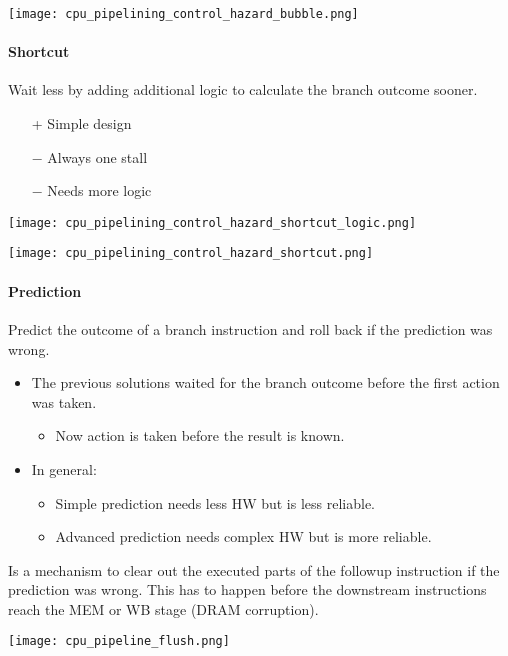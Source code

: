 \texttt{[image: cpu\_pipelining\_control\_hazard\_bubble.png]}

\paragraph{Shortcut}\label{shortcut}

Wait less by adding additional logic to calculate the branch outcome sooner.

\begin{itemize}
    \item[+] Simple design
    \item[$-$] Always one stall
    \item[$-$] Needs more logic
\end{itemize}

\texttt{[image: cpu\_pipelining\_control\_hazard\_shortcut\_logic.png]}

\texttt{[image: cpu\_pipelining\_control\_hazard\_shortcut.png]}

\paragraph{Prediction}\label{prediction}
Predict the outcome of a branch instruction and roll back if the prediction was wrong.
\begin{itemize}
    \item The previous solutions waited for the branch outcome before the first action was taken.
    \begin{itemize}
        \item Now action is taken before the result is known.
    \end{itemize}
    \item In general: 
    \begin{itemize}
        \item Simple prediction needs less HW but is less reliable.
        \item Advanced prediction needs complex HW but is more reliable.
    \end{itemize}
\end{itemize}

\newpar{}

Is a mechanism to clear out the executed parts of the followup instruction if the prediction was wrong. This has to happen before the downstream instructions reach the MEM or WB stage (DRAM corruption).
\begin{center}
    \texttt{[image: cpu\_pipeline\_flush.png]}
\end{center}
\newpar{}

